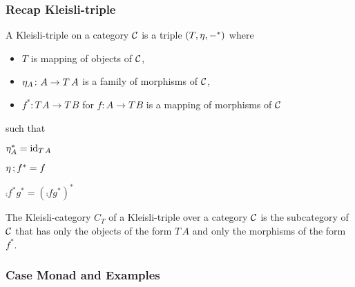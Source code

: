 \documentclass[runningheads,envcountsame]{llncs}
\begin{document}
\subsubsection{Recap Kleisli-triple}

\begin{definition}
    A Kleisli-triple on a category $\mathcal{C}$ is a triple $(T, \munit, -^*)$ where
    \begin{itemize}
        \item $T$ is mapping of objects of $\mathcal{C}$,
        \item $\munit_A \colon A \to T\,A$ is a family of morphisms of $\mathcal{C}$,
        \item $f^*\colon T\,A \to T\,B$ for $f\colon A \to T\,B$ is a mapping of morphisms of $\mathcal{C}$
    \end{itemize}
    such that
    \begin{definitionlist}
        \item \label{def:kleisli-eta-id} $\munit_A^* = \id_{T\,A}$
        \item \label{def:kleisli-eta-comp} $\comp{\munit}{f^*} = f$
        \item \label{def:kleisli-star-comp} $\comp{f^*}{g^*} = (\comp{f}{g^*})^*$
    \end{definitionlist}
    
    The Kleisli-category $C_T$ of a Kleisli-triple over a category $\mathcal{C}$ is the subcategory of $\mathcal{C}$ that has only the objects 
    of the form $T\,A$ and only the morphisms of the form $f^*$.
\end{definition}

\subsubsection{Case Monad and Examples}
\end{document}
